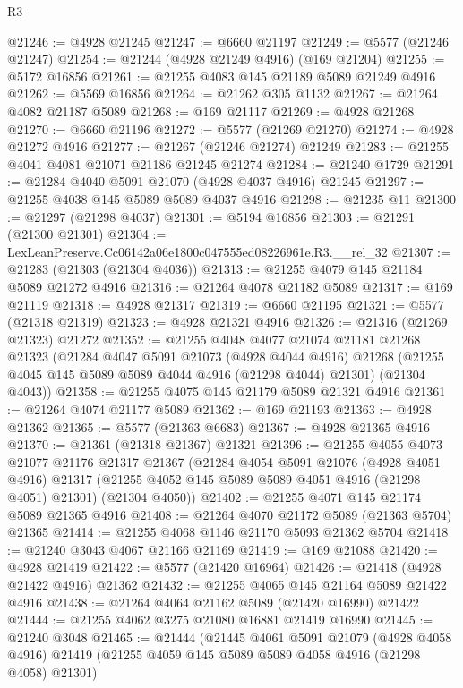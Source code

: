 \begin{lexlean}{R3}
\begin{coremodule}
@21246 := @4928 @21245
@21247 := @6660 @21197
@21249 := @5577 (@21246 @21247)
@21254 := @21244 (@4928 @21249 @4916) (@169 @21204)
@21255 := @5172 @16856
@21261 := @21255 @4083 @145 @21189 @5089 @21249 @4916
@21262 := @5569 @16856
@21264 := @21262 @305 @1132
@21267 := @21264 @4082 @21187 @5089
@21268 := @169 @21117
@21269 := @4928 @21268
@21270 := @6660 @21196
@21272 := @5577 (@21269 @21270)
@21274 := @4928 @21272 @4916
@21277 := @21267 (@21246 @21274) @21249
@21283 := @21255 @4041 @4081 @21071 @21186 @21245 @21274
@21284 := @21240 @1729
@21291 := @21284 @4040 @5091 @21070 (@4928 @4037 @4916) @21245
@21297 := @21255 @4038 @145 @5089 @5089 @4037 @4916
@21298 := @21235 @11
@21300 := @21297 (@21298 @4037)
@21301 := @5194 @16856
@21303 := @21291 (@21300 @21301)
@21304 := LexLeanPreserve.Cc06142a06e1800c047555ed08226961e.R3.__rel_32
@21307 := @21283 (@21303 (@21304 @4036))
@21313 := @21255 @4079 @145 @21184 @5089 @21272 @4916
@21316 := @21264 @4078 @21182 @5089
@21317 := @169 @21119
@21318 := @4928 @21317
@21319 := @6660 @21195
@21321 := @5577 (@21318 @21319)
@21323 := @4928 @21321 @4916
@21326 := @21316 (@21269 @21323) @21272
@21352 := @21255
    @4048
    @4077
    @21074
    @21181
    @21268
    @21323
    (@21284
      @4047
      @5091
      @21073
      (@4928 @4044 @4916)
      @21268
      (@21255 @4045 @145 @5089 @5089 @4044 @4916 (@21298 @4044) @21301)
      (@21304 @4043))
@21358 := @21255 @4075 @145 @21179 @5089 @21321 @4916
@21361 := @21264 @4074 @21177 @5089
@21362 := @169 @21193
@21363 := @4928 @21362
@21365 := @5577 (@21363 @6683)
@21367 := @4928 @21365 @4916
@21370 := @21361 (@21318 @21367) @21321
@21396 := @21255
    @4055
    @4073
    @21077
    @21176
    @21317
    @21367
    (@21284
      @4054
      @5091
      @21076
      (@4928 @4051 @4916)
      @21317
      (@21255 @4052 @145 @5089 @5089 @4051 @4916 (@21298 @4051) @21301)
      (@21304 @4050))
@21402 := @21255 @4071 @145 @21174 @5089 @21365 @4916
@21408 := @21264 @4070 @21172 @5089 (@21363 @5704) @21365
@21414 := @21255 @4068 @1146 @21170 @5093 @21362 @5704
@21418 := @21240 @3043 @4067 @21166 @21169
@21419 := @169 @21088
@21420 := @4928 @21419
@21422 := @5577 (@21420 @16964)
@21426 := @21418 (@4928 @21422 @4916) @21362
@21432 := @21255 @4065 @145 @21164 @5089 @21422 @4916
@21438 := @21264 @4064 @21162 @5089 (@21420 @16990) @21422
@21444 := @21255 @4062 @3275 @21080 @16881 @21419 @16990
@21445 := @21240 @3048
@21465 := @21444
    (@21445
      @4061
      @5091
      @21079
      (@4928 @4058 @4916)
      @21419
      (@21255 @4059 @145 @5089 @5089 @4058 @4916 (@21298 @4058) @21301)

\end{coremodule}
\end{lexlean}
